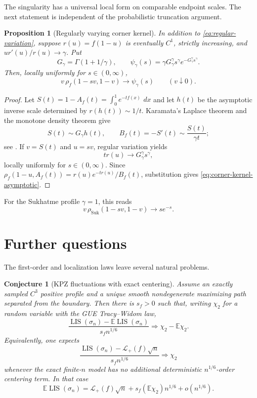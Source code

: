 \documentclass[11pt]{article}
\newtheorem{proposition}[theorem]{Proposition}
\newtheorem{conjecture}[theorem]{Conjecture}
\theoremstyle{remark}
\newcommand{\Ee}{\mathbb E}
\newcommand{\LIS}{\operatorname{LIS}}
\newcommand{\dd}{\,d}
\newcommand{\calL}{\mathcal L}
\begin{document}
The singularity has a universal local form on comparable endpoint scales.
The next statement is independent of the probabilistic truncation argument.

\begin{proposition}[Regularly varying corner kernel]
\label{prop:corner-kernel}
In addition to \eqref{eq:regular-variation}, suppose
$r(u)=f(1-u)$ is eventually $C^1$, strictly increasing, and
$ur'(u)/r(u)\to\gamma$.  Put
\[
        G_\gamma=\Gamma(1+1/\gamma),
        \qquad
        \psi_\gamma(s)
        =\gamma G_\gamma^\gamma s^\gamma
         e^{-G_\gamma^\gamma s^\gamma}.
\]
Then, locally uniformly for $s\in(0,\infty)$,
\begin{equation}\label{eq:corner-kernel-asymptotic}
        v\,\rho_f(1-sv,1-v)
        \longrightarrow\psi_\gamma(s)
        \qquad(v\downarrow0).
\end{equation}
\end{proposition}

\begin{proof}
Let
$S(t)=1-A_f(t)=\int_0^1e^{-tf(x)}\,\dd x$ and let $h(t)$ be the asymptotic
inverse scale determined by $r(h(t))\sim1/t$.  Karamata's Laplace theorem and
the monotone density theorem give
\[
 S(t)\sim G_\gamma h(t),
 \qquad
 B_f(t)=-S'(t)\sim\frac{S(t)}{\gamma t};
\]
see \cite[Sections~1.5 and 4.12]{BinghamGoldieTeugels1987}.  If
$v=S(t)$ and $u=sv$, regular variation yields
\[
        tr(u)\longrightarrow G_\gamma^\gamma s^\gamma,
\]
locally uniformly for $s\in(0,\infty)$.
Since
$\rho_f(1-u,A_f(t))=r(u)e^{-tr(u)}/B_f(t)$, substitution gives
\eqref{eq:corner-kernel-asymptotic}.
\end{proof}

For the Sukhatme profile $\gamma=1$, this reads
\[
        v\,\rho_{\mathrm{Suk}}(1-sv,1-v)\longrightarrow se^{-s}.
\]

\section{Further questions}
\label{sec:further}

The first-order and localization laws leave several natural problems.

\begin{conjecture}[KPZ fluctuations with exact centering]
\label{conj:TW}
Assume an exactly sampled $C^3$ positive profile and a unique smooth
nondegenerate maximizing path separated from the boundary.  Then there is
$s_f>0$ such that, writing $\chi_2$ for a random variable with the GUE
Tracy--Widom law,
\begin{equation}\label{eq:TW-conjecture}
        \frac{\LIS(\sigma_n)-\Ee\LIS(\sigma_n)}
             {s_fn^{1/6}}
        \Rightarrow \chi_2-\Ee\chi_2.
\end{equation}
Equivalently, one expects
\[
 \frac{\LIS(\sigma_n)-\calL_+(f)\sqrt n}
      {s_fn^{1/6}}
 \Rightarrow\chi_2
\]
whenever the exact finite-$n$ model has no additional deterministic
$n^{1/6}$-order centering term.  In that case
\[
 \Ee\LIS(\sigma_n)
 =\calL_+(f)\sqrt n+s_f(\Ee\chi_2)n^{1/6}+o(n^{1/6}).
\]
\end{conjecture}
\end{document}
